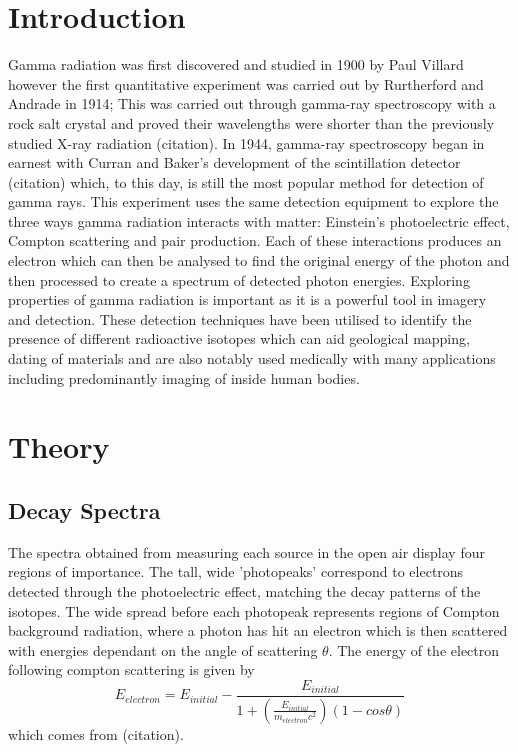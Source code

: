 \documentclass[11pt]{article} %
\begin{document}
\newpage %

\section{Introduction} 
\label{intro}
    Gamma radiation was first discovered and studied in 1900 by Paul Villard \cite{GammaRadiation} however the first quantitative experiment was carried out by Rurtherford and Andrade in 1914; This was carried out through gamma-ray spectroscopy with a rock salt crystal and proved their wavelengths were shorter than the previously studied X-ray radiation (citation). In 1944, gamma-ray spectroscopy began in earnest with Curran and Baker’s development of the scintillation detector (citation) which, to this day, is still the most popular method for detection of gamma rays. This experiment uses the same detection equipment to explore the three ways gamma radiation interacts with matter: Einstein’s photoelectric effect, Compton scattering and pair production. Each of these interactions produces an electron which can then be analysed to find the original energy of the photon and then processed to create a spectrum of detected photon energies. Exploring properties of gamma radiation is important as it is a powerful tool in imagery and detection. These detection techniques have been utilised to identify the presence of different radioactive isotopes which can aid geological mapping, dating of materials and are also notably used medically with many applications including predominantly imaging of inside human bodies.

\section{Theory}
    \subsection{Decay Spectra}
        The spectra obtained from measuring each source in the open air display four regions of importance. The tall, wide 'photopeaks' correspond to electrons detected through the photoelectric effect, matching the decay patterns of the isotopes. The wide spread before each photopeak represents regions of Compton background radiation, where a photon has hit an electron which is then scattered with energies dependant on the angle of scattering $\theta$. The energy of the electron following compton scattering is given by
        \begin{equation}\label{compton}
            E_{electron} = E_{initial}-\frac{E_{initial}}{1+(\frac{E_{initial}}{m_{electron}c^{2}})(1-cos\theta)}
        \end{equation}
        which comes from (citation).
\end{document}
